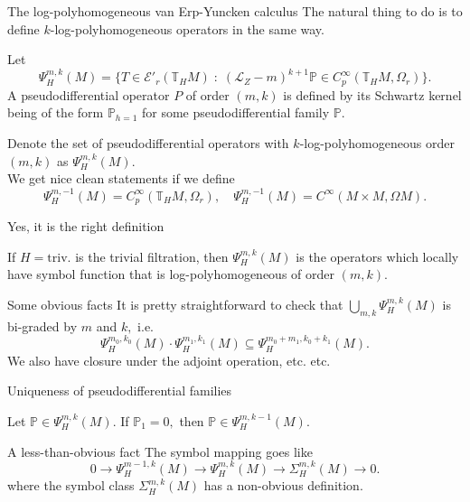 \documentclass{beamer}
\numberwithin{equation}{section}
\theoremstyle{plain}
\theoremstyle{plain}
\theoremstyle{definition}
\theoremstyle{plain}
\theoremstyle{plain}
\theoremstyle{definition}
\newcommand{\Ec}{\mathcal{E}}
\newcommand{\Lc}{\mathcal{L}}
\newcommand{\Tb}{\mathbb{T}}
\newcommand{\Pb}{\mathbb{P}}
\newcommand{\Psib}{\mathbb{\Psi}}
\begin{document}
\begin{frame}{The log-polyhomogeneous van Erp-Yuncken calculus}
    The natural thing to do is to define $k$-log-polyhomogeneous operators in the same way.
    \begin{definition}
        Let
        \[
            \Psib^{m,k}_H(M) = \{T\in \Ec'_r(\Tb_HM)\;:\;(\Lc_Z-m)^{k+1}\Pb \in C^{\infty}_p(\Tb_HM,\Omega_r)\}.
        \]
        A pseudodifferential operator $P$ of order $(m,k)$ is defined by its Schwartz kernel being of the form $\Pb_{h=1}$ for some pseudodifferential family $\Pb.$
    \end{definition}
    Denote the set of pseudodifferential operators with $k$-log-polyhomogeneous order $(m,k)$ as $\Psi^{m,k}_H(M).$\\
    \pause
    We get nice clean statements if we define
    \[
        \Psib^{m,-1}_H(M) = C^\infty_p(\Tb_HM,\Omega_r),\quad \Psi^{m,-1}_H(M) = C^\infty(M\times M,\Omega M).
    \]
\end{frame}

\begin{frame}{Yes, it is the right definition}
    \begin{theorem}[M. 2026]
        If $H = \mathrm{triv.}$ is the trivial filtration, then $\Psi^{m,k}_H(M)$ is the operators which locally have symbol function that is log-polyhomogeneous of order $(m,k).$
    \end{theorem}
\end{frame}

\begin{frame}{Some obvious facts}
    It is pretty straightforward to check that $\bigcup_{m,k}\Psi^{m,k}_H(M)$ is bi-graded by $m$ and $k,$ i.e.
    \[
        \Psi^{m_0,k_0}_H(M)\cdot \Psi^{m_1,k_1}_H(M)\subseteq \Psi^{m_0+m_1,k_0+k_1}_H(M).
    \]
    We also have closure under the adjoint operation, etc. etc.
\end{frame}

\begin{frame}{Uniqueness of pseudodifferential families}
    \begin{lemma}
        Let $\Pb \in \Psib^{m,k}_H(M).$ If $\Pb_1=0,$ then $\Pb \in \Psib^{m,k-1}_H(M).$
    \end{lemma}
\end{frame}

\begin{frame}{A less-than-obvious fact}
    The symbol mapping goes like
    \[
        0\rightarrow \Psi^{m-1,k}_H(M)\rightarrow \Psi^{m,k}_H(M)\rightarrow \Sigma^{m,k}_H(M)\rightarrow 0.
    \]
    where the symbol class $\Sigma^{m,k}_H(M)$ has a non-obvious definition.
\end{frame}
\end{document}
